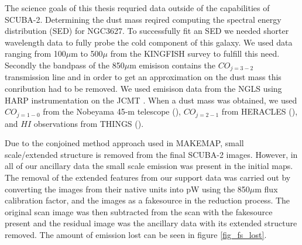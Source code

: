 The science goals of this thesis requried data outside of the capabilities of SCUBA-2.  Determining the dust mass reqired computing the spectral energy distribution (SED) for NGC3627.  To successfully fit an SED we needed shorter wavelength data to fully probe the cold component of this galaxy. We used data ranging from 100$\mu$m to 500$\mu$ from the KINGFISH survey \citet{kennicutt2011} to fulfill this need.  Secondly the bandpass of the 850$\mu$m emisison contains the $CO_{j=3-2}$ transmission line and in order to get an approximation on the dust mass this conribution had to be removed.  We used emisison data from the NGLS using HARP instrumentation on the JCMT \citet{wilson2012}.  When a dust mass was obtained, we used $CO_{j=1-0}$ from the Nobeyama 45-m telescope (\citet{kuno2007}), $CO_{j=2-1}$ from HERACLES (\citet{leroy2007}), and $HI$ observations from THINGS (\citet{walter2008}).

Due to the conjoined method approach used in MAKEMAP, small scale/extended structure is removed from the final SCUBA-2 images.  However, in all of our ancillary data the small scale emission was present in the initial maps.  The removal of the extended features from our support data was carried out by converting the images from their native units into pW using the 850$\mu$m flux calibration factor, and the images as a fakesource in the reduction process.  The original scan image was then subtracted from the scan with the fakesource present and the residual image was the ancillary data with its extended structure removed.  The amount of emission lost can be seen in figure \ref{fig_fs_lost}.








